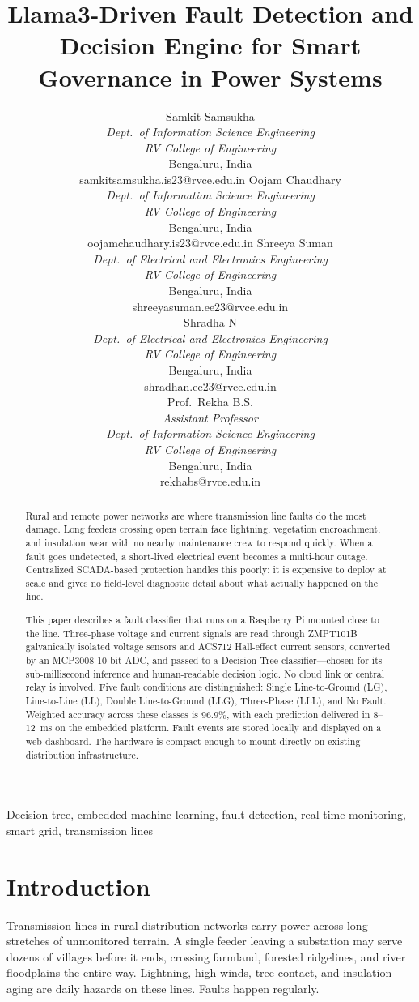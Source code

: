 \documentclass[journal]{IEEEtran}
\title{Llama3-Driven Fault Detection and Decision Engine for Smart Governance in Power Systems}
\author{%
\begin{tabular}{@{}ccc@{}}
\parbox[t]{1.9in}{\centering\small
  Samkit Samsukha\\[2pt]
  \textit{Dept.\ of Information Science Engineering}\\[1pt]
  \textit{RV College of Engineering}\\[1pt]
  Bengaluru, India\\[1pt]
  samkitsamsukha.is23@rvce.edu.in}
&
\parbox[t]{1.9in}{\centering\small
  Oojam Chaudhary\\[2pt]
  \textit{Dept.\ of Information Science Engineering}\\[1pt]
  \textit{RV College of Engineering}\\[1pt]
  Bengaluru, India\\[1pt]
  oojamchaudhary.is23@rvce.edu.in}
&
\parbox[t]{1.9in}{\centering\small
  Shreeya Suman\\[2pt]
  \textit{Dept.\ of Electrical and Electronics Engineering}\\[1pt]
  \textit{RV College of Engineering}\\[1pt]
  Bengaluru, India\\[1pt]
  shreeyasuman.ee23@rvce.edu.in}
\\[6em]
\multicolumn{3}{c}{%
  \parbox[t]{1.9in}{\centering\small
    Shradha N\\[2pt]
    \textit{Dept.\ of Electrical and Electronics Engineering}\\[1pt]
    \textit{RV College of Engineering}\\[1pt]
    Bengaluru, India\\[1pt]
  shradhan.ee23@rvce.edu.in}%
  \hspace{2.5em}%
  \parbox[t]{2.0in}{\centering\small
    Prof.\ Rekha B.S.\\[2pt]
    \textit{Assistant Professor}\\[1pt]
    \textit{Dept.\ of Information Science Engineering}\\[1pt]
    \textit{RV College of Engineering}\\[1pt]
    Bengaluru, India\\[1pt]
    rekhabs@rvce.edu.in}}\\
\end{tabular}
}
\begin{document}
\maketitle

\begin{abstract}
Rural and remote power networks are where transmission line faults do the most damage. Long feeders crossing open terrain face lightning, vegetation encroachment, and insulation wear with no nearby maintenance crew to respond quickly. When a fault goes undetected, a short-lived electrical event becomes a multi-hour outage. Centralized SCADA-based protection handles this poorly: it is expensive to deploy at scale and gives no field-level diagnostic detail about what actually happened on the line.

This paper describes a fault classifier that runs on a Raspberry Pi mounted close to the line. Three-phase voltage and current signals are read through ZMPT101B galvanically isolated voltage sensors and ACS712 Hall-effect current sensors, converted by an MCP3008 10-bit ADC, and passed to a Decision Tree classifier---chosen for its sub-millisecond inference and human-readable decision logic. No cloud link or central relay is involved. Five fault conditions are distinguished: Single Line-to-Ground (LG), Line-to-Line (LL), Double Line-to-Ground (LLG), Three-Phase (LLL), and No Fault. Weighted accuracy across these classes is 96.9\%, with each prediction delivered in 8--12~ms on the embedded platform. Fault events are stored locally and displayed on a web dashboard. The hardware is compact enough to mount directly on existing distribution infrastructure.
\end{abstract}


\begin{IEEEkeywords}
Decision tree, embedded machine learning, fault detection, real-time monitoring, smart grid, transmission lines
\end{IEEEkeywords}


\section{Introduction}
Transmission lines in rural distribution networks carry power across long stretches of unmonitored terrain. A single feeder leaving a substation may serve dozens of villages before it ends, crossing farmland, forested ridgelines, and river floodplains the entire way. Lightning, high winds, tree contact, and insulation aging are daily hazards on these lines. Faults happen regularly.
\end{document}
